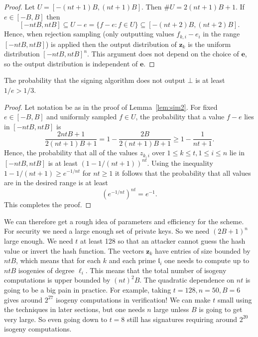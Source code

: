 \documentclass{llncs}
\renewcommand{\l}{\mathfrak{l}}
\newcommand{\e}{\textbf{e}}
\newcommand{\z}{\textbf{z}}
\begin{document}
\begin{proof}
Let $U = [-(nt+1)B, (nt+1)B]$. Then $\#U = 2(nt + 1)B + 1$.
If $e \in [-B, B]$ then 
\[
    [-ntB, ntB] \subseteq  U - e = \{ f - e : f \in U \} \subseteq [-(nt+2)B, (nt+2)B ].
\]
Hence, when rejection sampling (only outputting values $f_{k,i} - e_i$ in the range $[-ntB, ntB]$) is applied then the output distribution of $\z_k$ is the uniform distribution $[-ntB, ntB]^n$.
This argument does not depend on the choice of $\e$, so the output distribution is independent of $\e$.
\end{proof}



\begin{lemma}
The probability that the signing algorithm does not output $\bot$ is at least $1/e > 1/3$.
\end{lemma}

\begin{proof}
Let notation be as in the proof of Lemma~\ref{lem:sim2}.
For fixed $e \in [-B, B]$ and uniformly sampled $f \in U$, the probability that a value $f-e$ lies in $[-ntB, ntB]$ is
\[
   \frac{2ntB + 1}{2(nt+1)B + 1}  = 1 - \frac{2B}{2(nt+1)B + 1} \ge 1 - \frac{1}{nt+1}.
\]
Hence, the probability that all of the values $z_{k,i}$ over $1 \le k \le t, 1 \le i \le n$ lie in $[-ntB, ntB]$ is at least $(1 - 1/(nt+1))^{nt}$.
Using the inequality $1 - 1/(nt+1) \ge e^{-1/nt}$ for $nt \ge 1$ it follows that the probability that all values are in the desired range is at least
\[
   \left( e^{-1/nt} \right)^{nt} = e^{-1}.
\]
This completes the proof.
\end{proof}


We can therefore get a rough idea of parameters and efficiency for the scheme.
For security we need a large enough set of private keys. So we need $(2B+1)^n$ large enough.
We need $t$ at least 128 so that an attacker cannot guess the hash value or invert the hash function.
The vectors $\z_k$ have entries of size bounded by $ntB$, which means that for each $k$ and each prime $\l_i$ one needs to compute up to $ntB$ isogenies of degree $\ell_i$.
This means that the total number of isogeny computations is upper bounded by $(nt)^2 B$.
The quadratic dependence on $nt$ is going to be a big pain in practice.
For example, taking $t=128, n = 50, B = 6$ gives around $2^{27}$ isogeny computations in verification!
We can make $t$ small using the techniques in later sections, but one needs $n$ large unless $B$ is going to get very large. So even going down to $t=8$ still has signatures requiring around $2^{20}$ isogeny computations.
\end{document}
